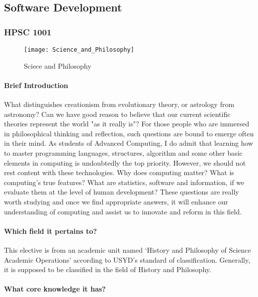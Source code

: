 \documentclass[12pt, a4paper]{article}
\begin{document}
	\subsection{Software Development}
	
	\subsubsection {HPSC 1001}

	\begin{figure}[h]
	\centering
	\texttt{[image: Science\_and\_Philosophy]}
	\caption{Sciece and Philosophy}
	\end{figure}

	\paragraph {Brief Introduction}

What distinguishes creationism from evolutionary theory, or astrology from astronomy? Can we have good reason to believe that our current scientific theories represent the world "as it really is"? For those people who are immersed in philosophical thinking and reflection, such questions are bound to emerge often in their mind. As students of Advanced Computing, I do admit that learning how to master programming languages, structures,  algorithm and some other basic elements in computing is undoubtedly the top priority. However, we should not rest content with these technologies. Why does computing matter? What is computing’s true features? What are statistics, software and information, if we evaluate them at the level of human development? These questions are really worth studying and once we find appropriate answers, it will enhance our understanding of computing and assist us to innovate and reform in this field.

	\paragraph {Which field it pertains to?}

This elective is from an academic unit named ‘History and Philosophy of Science Academic Operations' according to USYD’s standard of classification. Generally, it is supposed to be classified in the field of History and Philosophy.

	\paragraph {What core knowledge it has?} 
\end{document}
